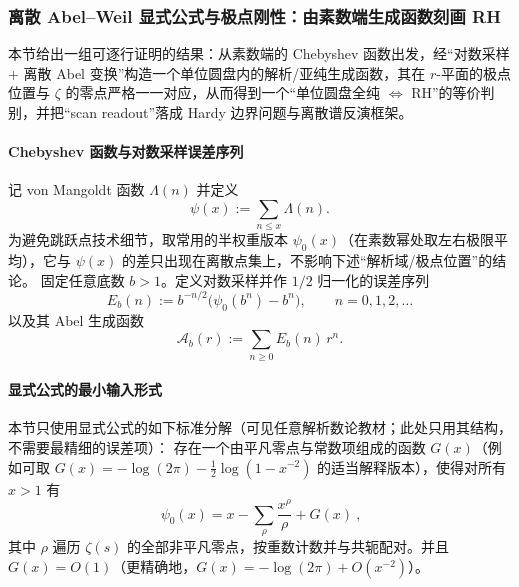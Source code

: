 \subsubsection{离散 Abel--Weil 显式公式与极点刚性：由素数端生成函数刻画 RH}\label{subsec:discrete-abel-weil-polar-rigidity}
本节给出一组可逐行证明的结果：从素数端的 Chebyshev 函数出发，经“对数采样 + 离散 Abel 变换”构造一个单位圆盘内的解析/亚纯生成函数，其在 \(r\)-平面的极点位置与 \(\zeta\) 的零点严格一一对应，从而得到一个“单位圆盘全纯 \(\Leftrightarrow\) RH”的等价判别，并把“scan readout”落成 Hardy 边界问题与离散谱反演框架。

\paragraph{Chebyshev 函数与对数采样误差序列}
记 von Mangoldt 函数 \(\Lambda(n)\) 并定义
\[
\psi(x):=\sum_{n\le x}\Lambda(n).
\]
为避免跳跃点技术细节，取常用的半权重版本 \(\psi_0(x)\)（在素数幂处取左右极限平均），它与 \(\psi(x)\) 的差只出现在离散点集上，不影响下述“解析域/极点位置”的结论。
固定任意底数 \(b>1\)。定义对数采样并作 \(1/2\) 归一化的误差序列
\[
\boxed{\ E_b(n):=b^{-n/2}\bigl(\psi_0(b^n)-b^n\bigr),\qquad n=0,1,2,\dots\ }
\]
以及其 Abel 生成函数
\[
\boxed{\ \mathcal A_b(r):=\sum_{n\ge 0}E_b(n)\,r^n.\ }
\]

\paragraph{显式公式的最小输入形式}
本节只使用显式公式的如下标准分解（可见任意解析数论教材；此处只用其结构，不需要最精细的误差项）：
存在一个由平凡零点与常数项组成的函数 \(G(x)\)（例如可取 \(G(x)=-\log(2\pi)-\tfrac12\log(1-x^{-2})\) 的适当解释版本），使得对所有 \(x>1\) 有
\begin{equation}\label{eq:psi0-explicit-schematic}
\boxed{\ \psi_0(x)=x-\sum_{\rho}\frac{x^\rho}{\rho}+G(x)\ },
\end{equation}
其中 \(\rho\) 遍历 \(\zeta(s)\) 的全部非平凡零点，按重数计数并与共轭配对。并且 \(G(x)=O(1)\)（更精确地，\(G(x)=-\log(2\pi)+O(x^{-2})\)）。

